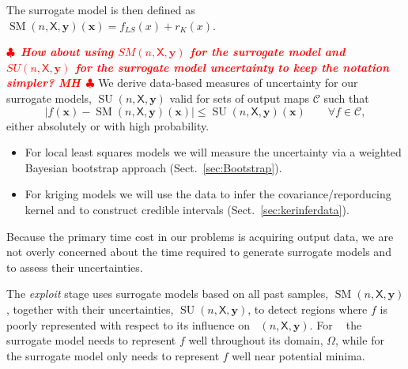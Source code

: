 \documentclass[11pt]{NSFamsart}
\DeclareMathOperator{\QOI}{QOI} %
\DeclareMathOperator{\APP}{\widehat{\QOI}}
\DeclareMathOperator{\SURR}{SM} %
\DeclareMathOperator{\MIN}{MIN}
\DeclareMathOperator{\ID}{ID}
\DeclareMathOperator{\APPMIN}{\widehat{\MIN}}
\DeclareMathOperator{\APPID}{\widehat{\ID}}
\DeclareMathOperator{\SURRERR}{SU}
\newcommand{\mX}{\mathsf{X}}
\newcommand{\bx}{{\boldsymbol{x}}}
\newcommand{\by}{{\boldsymbol{y}}}
\newcommand{\calc}{{\mathcal{C}}}
\def\abs#1{\ensuremath{\left \lvert #1 \right \rvert}}
\newif\ifnotesw \noteswtrue
\newcommand{\notes}[1]{\ifnotesw \textcolor{red}{  $\clubsuit$\ {\sf \bf \it  #1}\ $\clubsuit$  }\fi}
\begin{document}
The surrogate model is then defined as $\SURR(n,\mX,\by)(\bx)=f_{LS}(x) + r_{K}(x)$.  

\notes{How about using $SM(n,\mX,\by)$ for the surrogate model and $SU(n,\mX,\by)$ for the surrogate model uncertainty to keep the notation simpler? MH}
We derive data-based measures of uncertainty for our surrogate models, $\SURRERR(n,\mX,\by)$ valid for sets of output maps $\calc$ such that 
\begin{equation}
    \abs{f(\bx)-\SURR(n,\mX,\by)(\bx)} \le \SURRERR(n,\mX,\by)(\bx) \qquad \forall f \in \calc,
\end{equation}
either absolutely or with high probability.
\begin{itemize}
\item For local least squares models we will measure the uncertainty via a weighted Bayesian bootstrap approach (Sect.\ \ref{sec:Bootstrap}).
\item For kriging models we will use the data to infer the   covariance/reporducing kernel and to construct credible intervals (Sect.\ \ref{sec:kerinferdata}).
\end{itemize}
Because the primary time cost in our problems is acquiring output data, we are not overly concerned about the time required to generate surrogate models and to assess their uncertainties.

The \emph{exploit} stage uses surrogate models based on all past samples, $\SURR(n,\mX,\by)$, together with their uncertainties, $\SURRERR(n,\mX,\by)$, to detect regions where $f$ is poorly represented with respect to its influence on $\APP(n,\mX,\by)$.  For $\APPID$ the surrogate model needs to represent $f$ well throughout its domain, $\Omega$, while for $\APPMIN$ the surrogate model only needs to represent $f$ well near potential minima.
\end{document}
